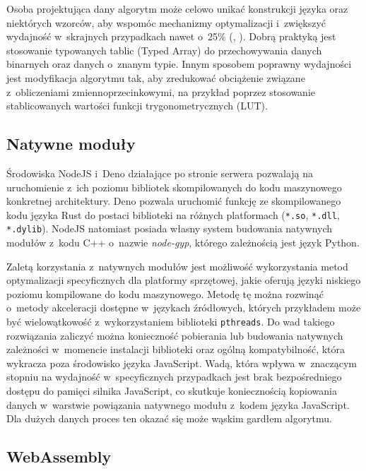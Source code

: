 Osoba projektująca dany algorytm może celowo unikać konstrukcji języka oraz niektórych wzorców, aby wspomóc mechanizmy optymalizacji i~zwiększyć wydajność w~skrajnych przypadkach nawet o~25\% (\cite{gong2015jitprof}, \cite{selakovic2016performance}). Dobrą praktyką jest stosowanie typowanych tablic (Typed Array) do przechowywania danych binarnych oraz danych o~znanym typie. Innym sposobem poprawny wydajności jest modyfikacja algorytmu tak, aby zredukować obciążenie związane z~obliczeniami zmiennoprzecinkowymi, na przykład poprzez stosowanie stablicowanych wartości funkcji trygonometrycznych (LUT).

\subsection{Natywne moduły}

Środowiska NodeJS i~Deno działające po stronie serwera pozwalają na uruchomienie z~ich poziomu bibliotek skompilowanych do kodu maszynowego konkretnej architektury. Deno pozwala uruchomić funkcję ze skompilowanego kodu języka Rust do postaci biblioteki na różnych platformach (\lstinline{*.so}, \lstinline{*.dll}, \lstinline{*.dylib}). NodeJS natomiast posiada własny system budowania natywnych modułów z~kodu C++ o~nazwie \textit{node-gyp}, którego zależnością jest język Python.

Zaletą korzystania z~natywnych modułów jest możliwość wykorzystania metod optymalizacji specyficznych dla platformy sprzętowej, jakie oferują języki niskiego poziomu kompilowane do kodu maszynowego. Metodę tę można rozwinąć o~metody akceleracji dostępne w~językach źródłowych, których przykładem może być wielowątkowość z~wykorzystaniem biblioteki \lstinline{pthreads}. Do wad takiego rozwiązania zaliczyć można konieczność pobierania lub budowania natywnych zależności w~momencie instalacji biblioteki oraz ogólną kompatybilność, która wykracza poza środowisko języka JavaScript. Wadą, która wpływa w~znaczącym stopniu na wydajność w~specyficznych przypadkach jest brak bezpośredniego dostępu do pamięci silnika JavaScript, co skutkuje koniecznością kopiowania danych w~warstwie powiązania natywnego modułu z~kodem języka JavaScript. Dla dużych danych proces ten okazać się może wąskim gardłem algorytmu.

\subsection{WebAssembly}

